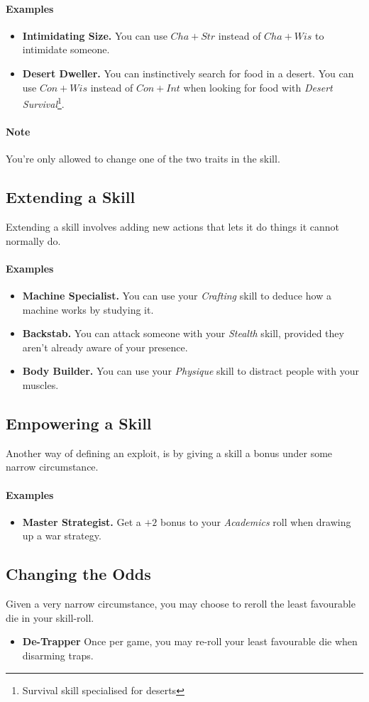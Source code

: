 \paragraph{Examples}
\begin{itemize}
    \item \textbf{Intimidating Size.} You can use $Cha+Str$ instead of $Cha+Wis$ to intimidate someone.
    \item \textbf{Desert Dweller.} You can instinctively search for food in a desert. You can use $Con+Wis$ instead of $Con+Int$ when looking for food with \textit{Desert Survival}\footnote{Survival skill specialised for deserts}.
\end{itemize}

\paragraph{Note} You're only allowed to change one of the two traits in the skill.

\subsection{Extending a Skill}
Extending a skill involves adding new actions that lets it do things it cannot normally do.

\paragraph{Examples}
\begin{itemize}
    \item \textbf{Machine Specialist.} You can use your \textit{Crafting} skill to deduce how a machine works by studying it.
    \item \textbf{Backstab.} You can attack someone with your \textit{Stealth} skill, provided they aren't already aware of your presence.
    \item \textbf{Body Builder.} You can use your \textit{Physique} skill to distract people with your muscles.
\end{itemize}

\subsection{Empowering a Skill}
Another way of defining an exploit, is by giving a skill a bonus under some narrow circumstance.

\paragraph{Examples}
\begin{itemize}
\item \textbf{Master Strategist.} Get a $+2$ bonus to your \textit{Academics} roll when drawing up a war strategy.
\end{itemize}

\subsection{Changing the Odds}
Given a very narrow circumstance, you may choose to reroll the least favourable die in your skill-roll.
\begin{itemize}
\item \textbf{De-Trapper} Once per game, you may re-roll your least favourable die when disarming traps.
\end{itemize}
